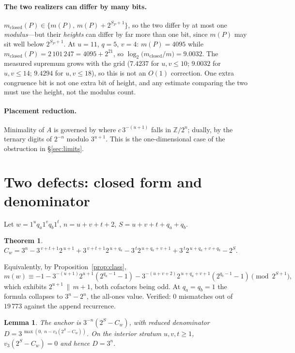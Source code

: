 \documentclass[11pt,a4paper]{article}
\theoremstyle{plain}
\newtheorem{theorem}[proposition]{Theorem}
\newtheorem{lemma}[proposition]{Lemma}
\theoremstyle{definition}
\begin{document}
\paragraph{The two realizers can differ by many bits.}
$m_{\mathrm{closed}}(P)\in\{m(P),\,m(P)+2^{S_P+1}\}$, so the two differ by at
most one \emph{modulus}---but their \emph{heights} can differ by far more than
one bit, since $m(P)$ may sit well below $2^{S_P+1}$. At $u=11$, $q=5$, $v=4$:
$m(P)=4095$ while $m_{\mathrm{closed}}(P)=2\,101\,247=4095+2^{21}$, so
$\log_2\bigl(m_{\mathrm{closed}}/m\bigr)=9.0032$. The measured supremum grows
with the grid ($7.4237$ for $u,v\le10$; $9.0032$ for $u,v\le14$; $9.4294$ for
$u,v\le18$), so this is not an $O(1)$ correction. One extra congruence bit is
not one extra bit of height, and any estimate comparing the two must use the
height, not the modulus count.

\paragraph{Placement reduction.}
Minimality of $A$ is governed by where $c\,3^{-(u+1)}$ falls in
$\mathbb{Z}/2^{n}$; dually, by the ternary digits of $2^{-n}$ modulo
$3^{u+1}$. This is the one-dimensional case of the obstruction in
\S\ref{sec:limits}.

\section{Two defects: closed form and denominator}\label{sec:r1}

Let $w=1^{u}q_a1^{v}q_b1^{t}$, $n=u+v+t+2$, $S=u+v+t+q_a+q_b$.

\begin{theorem}\label{thm:r1}
$C_w=3^{n}-3^{\,v+t+1}2^{\,u+1}+3^{\,v+t+1}2^{\,u+q_a}
-3^{\,t}2^{\,u+q_a+v+1}+3^{\,t}2^{\,u+q_a+v+q_b}-2^{S}.$
\end{theorem}

Equivalently, by Proposition~\ref{prop:class},
\[
m(w)\equiv -1-3^{-(u+1)}2^{u+1}\!\left(2^{q_a-1}-1\right)
-3^{-(u+v+2)}2^{\,u+q_a+v+1}\!\left(2^{q_b-1}-1\right)\pmod{2^{S+1}},
\]
which exhibits $2^{u+1}\,\|\,m+1$, both cofactors being odd. At $q_a=q_b=1$ the
formula collapses to $3^{n}-2^{n}$, the all-ones value. Verified: $0$
mismatches out of $19\,773$ against the append recurrence.

\begin{lemma}\label{lem:denom}
The anchor is $3^{-n}(2^{S}-C_w)$, with reduced denominator
$D=3^{\,\max(0,\;n-v_3(2^{S}-C_w))}$. On the interior stratum $u,v,t\ge1$,
$v_3(2^{S}-C_w)=0$ and hence $D=3^{n}$.
\end{lemma}
\end{document}
